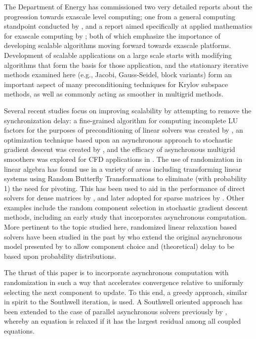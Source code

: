 \documentclass{article}
\theoremstyle{definition}
\theoremstyle{example}
\theoremstyle{example}
\theoremstyle{example}
\begin{document}
The Department of Energy has commissioned two very detailed reports about the progression towards exascale level computing; one from a general computing standpoint conducted by \cite{ashby2010ascac}, and a report aimed specifically at applied mathematics for exascale computing by \cite{dongarra2014applied}; both of which emphasize the importance of developing scalable algorithms moving forward towards exascale platforms. Development of scalable applications on a large scale starts with modifying algorithms that form the basis for those application, and the stationary iterative methods examined here (e.g., Jacobi, Gauss-Seidel, block variants) form an important aspect of many preconditioning techniques for Krylov subspace methods, as well as commonly acting as smoother in multigrid methods.

Several recent studies focus on improving scalability by attempting to remove the synchronization delay: a fine-grained algorithm for computing incomplete LU factors for the purposes of preconditioning of linear solvers was created by \cite{chow2015fine}, an optimization technique based upon an asynchronous approach to stochastic gradient descent was created by \cite{recht2011hogwild}, and the efficacy of  asynchronous multigrid smoothers was explored for CFD applications in \cite{kashi2018asynchronous}. The use of randomization in linear algebra has found use in a variety of areas including transforming linear systems using Random Butterfly Transformations to eliminate (with probability 1) the need for pivoting. This has been used to aid in the performance of direct solvers for dense matrices by \cite{parker1995random}, and later adopted for sparse matrices by \cite{baboulin2014using}. Other examples include the random component selection in stochastic gradient descent methods, including an early study \cite{srivastava2011distributed} that incorporates asynchronous computation. More pertinent to the topic studied here, randomized linear relaxation based solvers have been studied in the past by \cite{strikwerda2002probabilistic} who extend the original asynchronous model presented by \cite{chazan1969chaotic} to allow component choice and (theoretical) delay to be based upon probability distributions.

The thrust of this paper is to incorporate asynchronous computation with randomization in such a way that accelerates convergence relative to uniformly selecting the next component to update. To this end, a greedy approach, similar in spirit to the Southwell iteration, is used. A Southwell oriented approach has been extended to the case of parallel asynchronous solvers previously by \cite{wolfson2017distributed}, whereby an equation is relaxed if it has the largest residual among all coupled equations. 
\end{document}
